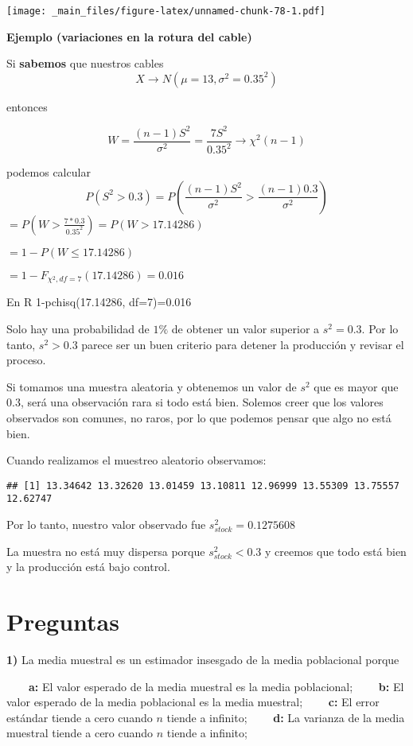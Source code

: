 \documentclass[
]{book}
\begin{document}
\texttt{[image: \_main\_files/figure-latex/unnamed-chunk-78-1.pdf]}

\textbf{Ejemplo (variaciones en la rotura del cable)}

Si \textbf{sabemos} que nuestros cables
\[X \rightarrow N(\mu=13, \sigma^2=0.35^2)\]

entonces

\[W=\frac{(n-1)S^2}{\sigma^2}= \frac{7S^2}{0.35^2} \rightarrow \chi^2(n-1)\]

podemos calcular \[P(S^2 > 0.3)=P(\frac{(n-1)S^2}{\sigma^2} > \frac{(n-1)0.3}{\sigma^2 })\]
\(=P(W > \frac{7*0.3}{0.35^2})=P(W > 17.14286)\)

\(=1-P(W \leq 17.14286)\)

\(= 1- F_{\chi^2,df=7}(17.14286)=0.016\)

En R
1-pchisq(17.14286, df=7)=0.016

Solo hay una probabilidad de \(1\%\) de obtener un valor superior a \(s^2=0.3\). Por lo tanto, \(s^2>0.3\) parece ser un buen criterio para detener la producción y revisar el proceso.

Si tomamos una muestra aleatoria y obtenemos un valor de \(s ^2\) que es mayor que \(0.3\), será una observación rara si todo está bien. Solemos creer que los valores observados son comunes, no raros, por lo que podemos pensar que algo no está bien.

Cuando realizamos el muestreo aleatorio observamos:

\begin{verbatim}
## [1] 13.34642 13.32620 13.01459 13.10811 12.96999 13.55309 13.75557 12.62747
\end{verbatim}

Por lo tanto, nuestro valor observado fue \(s^2_{stock}=0.1275608\)

La muestra no está muy dispersa porque \(s^2_{stock} < 0.3\) y creemos que todo está bien y la producción está bajo control.

\hypertarget{preguntas-7}{%
\section{Preguntas}\label{preguntas-7}}

\textbf{1)} La media muestral es un estimador insesgado de la media poblacional porque

\textbf{\(\qquad\)a:} El valor esperado de la media muestral es la media poblacional;
\textbf{\(\qquad\)b:} El valor esperado de la media poblacional es la media muestral;
\textbf{\(\qquad\)c:} El error estándar tiende a cero cuando \(n\) tiende a infinito;
\textbf{\(\qquad\)d:} La varianza de la media muestral tiende a cero cuando \(n\) tiende a infinito;
\end{document}
